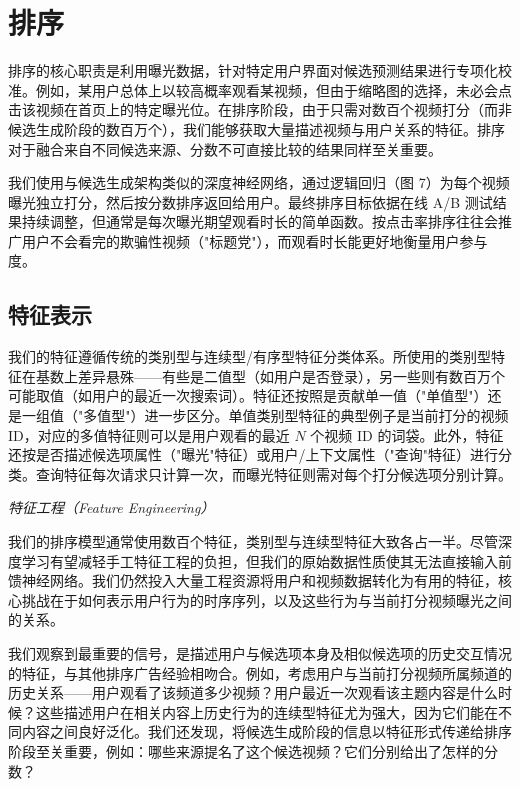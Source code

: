 \section{排序}

排序的核心职责是利用曝光数据，针对特定用户界面对候选预测结果进行专项化校准。例如，某用户总体上以较高概率观看某视频，但由于缩略图的选择，未必会点击该视频在首页上的特定曝光位。在排序阶段，由于只需对数百个视频打分（而非候选生成阶段的数百万个），我们能够获取大量描述视频与用户关系的特征。排序对于融合来自不同候选来源、分数不可直接比较的结果同样至关重要。

我们使用与候选生成架构类似的深度神经网络，通过逻辑回归（图 7）为每个视频曝光独立打分，然后按分数排序返回给用户。最终排序目标依据在线 A/B 测试结果持续调整，但通常是每次曝光期望观看时长的简单函数。按点击率排序往往会推广用户不会看完的欺骗性视频（"标题党"），而观看时长能更好地衡量用户参与度。

\subsection{特征表示}

我们的特征遵循传统的类别型与连续型/有序型特征分类体系。所使用的类别型特征在基数上差异悬殊——有些是二值型（如用户是否登录），另一些则有数百万个可能取值（如用户的最近一次搜索词）。特征还按照是贡献单一值（"单值型"）还是一组值（"多值型"）进一步区分。单值类别型特征的典型例子是当前打分的视频 ID，对应的多值特征则可以是用户观看的最近 $N$ 个视频 ID 的词袋。此外，特征还按是否描述候选项属性（"曝光"特征）或用户/上下文属性（"查询"特征）进行分类。查询特征每次请求只计算一次，而曝光特征则需对每个打分候选项分别计算。

\textit{特征工程（Feature Engineering）}

我们的排序模型通常使用数百个特征，类别型与连续型特征大致各占一半。尽管深度学习有望减轻手工特征工程的负担，但我们的原始数据性质使其无法直接输入前馈神经网络。我们仍然投入大量工程资源将用户和视频数据转化为有用的特征，核心挑战在于如何表示用户行为的时序序列，以及这些行为与当前打分视频曝光之间的关系。

我们观察到最重要的信号，是描述用户与候选项本身及相似候选项的历史交互情况的特征，与其他排序广告经验相吻合。例如，考虑用户与当前打分视频所属频道的历史关系——用户观看了该频道多少视频？用户最近一次观看该主题内容是什么时候？这些描述用户在相关内容上历史行为的连续型特征尤为强大，因为它们能在不同内容之间良好泛化。我们还发现，将候选生成阶段的信息以特征形式传递给排序阶段至关重要，例如：哪些来源提名了这个候选视频？它们分别给出了怎样的分数？

